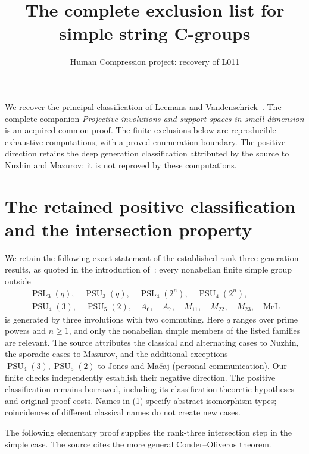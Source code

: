 \documentclass[11pt,a4paper]{article}
\title{The complete exclusion list for simple string C-groups}
\author{Human Compression project: recovery of L011}\date{}
\begin{document}
\maketitle
We recover the principal classification of Leemans and Vandenschrick~\cite{LV}.
The complete companion \emph{Projective involutions and support spaces in small
dimension} is an acquired common proof. The finite exclusions below are
reproducible exhaustive computations, with a proved enumeration boundary.
The positive direction retains the deep generation classification attributed
by the source to Nuzhin and Mazurov; it is not reproved by these computations.

\section{The retained positive classification and the intersection property}
We retain the following exact statement of the established rank-three
generation results, as quoted in the introduction of~\cite{LV}: every
nonabelian finite simple group outside
\[
\begin{gathered}
 \operatorname{PSL}_3(q),\quad \operatorname{PSU}_3(q),\quad
 \operatorname{PSL}_4(2^n),\quad \operatorname{PSU}_4(2^n),\\
 \operatorname{PSU}_4(3),\quad\operatorname{PSU}_5(2),\quad A_6,\quad A_7,
 \quad M_{11},\quad M_{22},\quad M_{23},\quad \mathrm{McL}
\end{gathered}\tag{1}
\]
is generated by three involutions with two commuting. Here $q$ ranges over
prime powers and $n\ge1$, and only the nonabelian simple members of the
listed families are relevant. The source attributes the classical and
alternating cases to Nuzhin, the sporadic cases to Mazurov, and the additional
exceptions $\operatorname{PSU}_4(3),\operatorname{PSU}_5(2)$ to Jones and
Ma\v caj (personal communication). Our finite checks independently establish
their negative direction. The positive classification remains borrowed,
including its classification-theoretic hypotheses and original proof costs.
Names in (1) specify abstract isomorphism types; coincidences of different
classical names do not create new cases.

The following elementary proof supplies the rank-three intersection step
in the simple case. The source cites the more general Conder--Oliveros theorem.
\end{document}
